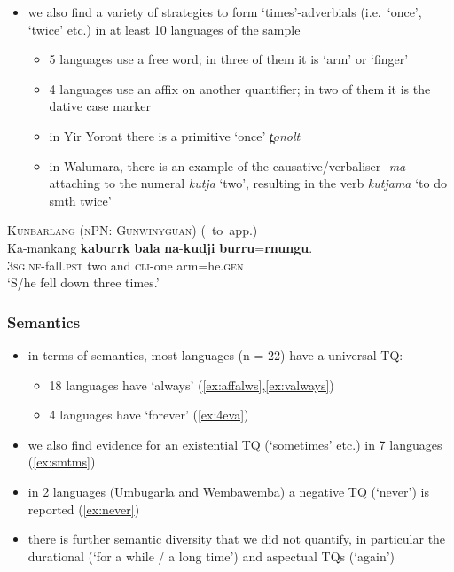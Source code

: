 \documentclass{article}
\begin{document}
\begin{itemize}
\item we also find a variety of strategies to form `times'-adverbials (i.e.\ `once', `twice' etc.) in at least 10 languages of the sample
  \begin{itemize}
  \item 5 languages use a free word; in three of them it is `arm' or `finger' %
  \item 4 languages use an affix on another quantifier; in two of them it is the dative case marker %
  \item in Yir Yoront there is a primitive `once' \textit{\charis t̪onolt}
  \item in Walumara, there is an example of the causative/verbaliser -\textit{\charis ma} attaching to the numeral \textit{\charis kutja} `two', resulting in the verb \textit{\charis kutjama} `to do smth twice' %
  \end{itemize}
\end{itemize}
\begin{exe}
  \ex\label{ex:2arm} \textsc{Kunbarlang (nPN: Gunwinyguan)} (\citealt{ikthesis}~to~app.)\\
  \gll Ka-mankang \textbf{kaburrk} \textbf{bala} \textbf{na}-\textbf{kudji} \textbf{burru}=\textbf{rnungu}.\\
  \textsc{3sg.nf}-fall.\textsc{pst} two and \textsc{cli}-one arm=he.\textsc{gen}\\
  \glt `S/he fell down three times.' %
\end{exe}

\subsubsection{Semantics}
\label{sec:tqsem}
\begin{itemize}
\item in terms of semantics, most languages (n = 22) have a universal TQ:
  \begin{itemize}
  \item 18 languages have `always' (\ref{ex:affalws},\ref{ex:valways})
  \item 4 languages have `forever' (\ref{ex:4eva})
  \end{itemize}
\item we also find evidence for an existential TQ (`sometimes' etc.) in 7 languages (\ref{ex:smtms}) %
\item in 2 languages (Umbugarla and Wembawemba) a negative TQ (`never') is reported (\ref{ex:never})
\item there is further semantic diversity that we did not quantify, in particular the durational (`for a while / a long time') and aspectual TQs (`again')
\end{itemize}
\end{document}
